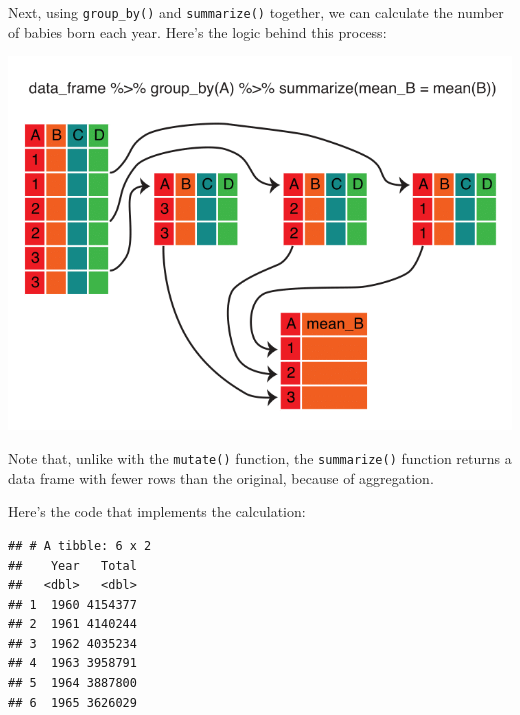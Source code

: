\documentclass[]{book}
\newenvironment{Shaded}{\begin{snugshade}}{\end{snugshade}}
\newcommand{\CommentTok}[1]{\textcolor[rgb]{0.56,0.35,0.01}{\textit{#1}}}
\newcommand{\DataTypeTok}[1]{\textcolor[rgb]{0.13,0.29,0.53}{#1}}
\newcommand{\KeywordTok}[1]{\textcolor[rgb]{0.13,0.29,0.53}{\textbf{#1}}}
\newcommand{\NormalTok}[1]{#1}
\newcommand{\OperatorTok}[1]{\textcolor[rgb]{0.81,0.36,0.00}{\textbf{#1}}}
\newcommand{\StringTok}[1]{\textcolor[rgb]{0.31,0.60,0.02}{#1}}
\begin{document}
Next, using \texttt{group\_by()} and \texttt{summarize()} together, we can calculate the
number of babies born each year. Here's the logic behind this process:

\includegraphics{R/Rintro/images/summarize_group_by.png}

Note that, unlike with the \texttt{mutate()} function, the \texttt{summarize()} function returns a data frame
with fewer rows than the original, because of aggregation.

Here's the code that implements the calculation:

\begin{Shaded}
\end{Shaded}

\begin{verbatim}
## # A tibble: 6 x 2
##    Year   Total
##   <dbl>   <dbl>
## 1  1960 4154377
## 2  1961 4140244
## 3  1962 4035234
## 4  1963 3958791
## 5  1964 3887800
## 6  1965 3626029
\end{verbatim}
\end{document}
